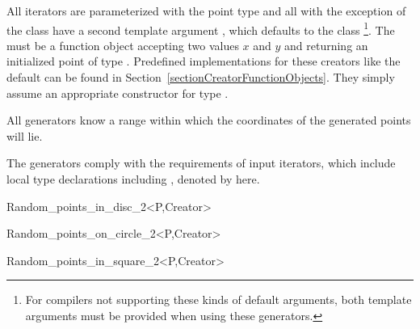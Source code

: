 All iterators are parameterized with the point type  and all
with the exception of the class  have a second
template argument , which defaults to the class
\footnote{%
  For compilers not supporting these kinds of default arguments, both
  template arguments must be provided when using these generators.}.
The  must be a function object accepting two 
values $x$ and $y$ and returning an initialized point  of type
. Predefined implementations for these creators like the
default can be found in Section~\ref{sectionCreatorFunctionObjects}.
They simply assume an appropriate constructor for type .

All generators know a range within which the coordinates of the
generated points will lie.


\ccTypes

The generators comply with the requirements of input iterators, which
include local type declarations including , 
denoted by  here.

\ccCreation
\ccTwo{}{\hspace*{11cm}}

\ccHtmlNoClassFile
\begin{ccClassTemplate}{Random_points_in_disc_2<P,Creator>}
\end{ccClassTemplate}

\ccHtmlNoClassFile
\begin{ccClassTemplate}{Random_points_on_circle_2<P,Creator>}
\end{ccClassTemplate}

\ccHtmlNoClassFile
\begin{ccClassTemplate}{Random_points_in_square_2<P,Creator>}
\end{ccClassTemplate}

